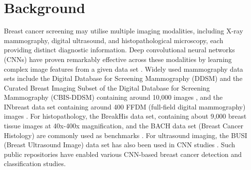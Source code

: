 \documentclass[../main]{subfiles}
\begin{document}
\chapter{Background}
\label{chap:background}
Breast cancer screening may utilise multiple imaging modalities, including X-ray mammography, digital ultrasound, and histopathological microscopy, each providing distinct diagnostic information. Deep convolutional neural networks (CNNs) have proven remarkably effective across these modalities by learning complex image features from a given data set \autocite{jiang2024deep} \autocite{carriero2024deep}. Widely used mammography data sets include the Digital Database for Screening Mammography (DDSM) \autocite{carriero2024deep} and the Curated Breast Imaging Subset of the Digital Database for Screening Mammography (CBIS-DDSM) containing around 10,000 images \autocite{carriero2024deep}, and the INbreast data set containing around 400 FFDM (full-field digital mammography) images \autocite{carriero2024deep}. For histopathology, the BreakHis data set, containing about 9,000 breast tissue images at 40x-400x magnification, and the BACH data set (Breast Cancer Histology) are commonly used as benchmarks \autocite{jiang2024deep} \autocite{srikantamurthy2023classification}. For ultrasound imaging, the BUSI (Breast Ultrasound Image) data set has also been used in CNN studies \autocite{latha2024revolutionizing}. Such public repositories have enabled various CNN-based breast cancer detection and classification studies.
\end{document}
